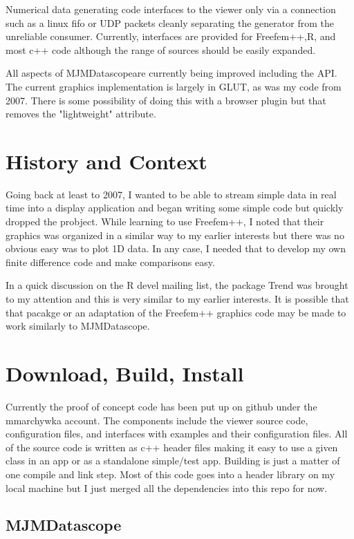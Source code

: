 \documentclass[aps,secnumarabic,balancelastpage,amsmath,amssymb,nofootinbib]{revtex4}
\newcommand{\mjmprod}{MJMDatascope}
\begin{document}
Numerical data generating code interfaces to the viewer
only via a connection such as a linux fifo or 
UDP packets cleanly separating the generator from the 
unreliable consumer. Currently, interfaces are provided
for Freefem++,R, and most c++ code although the range
of sources should be easily expanded. 

All aspects of \mjmprod are currently being improved
including the API. The current graphics implementation
is largely in GLUT, as was my code from 2007. There is some
possibility of doing this with a browser plugin but
that removes the "lightweight" attribute. 

\section{History and Context  }
Going back at least to 2007, I wanted to be able to stream simple
data in real time into a display application and began writing
some simple code but quickly dropped the probject. While
learning to use Freefem++, I noted that their graphics 
was organized in a similar way to my earlier interests but
there was no obvious easy was to plot 1D data. In any case,
I needed that to develop my own finite difference code
and make comparisons easy.

In a quick discussion on the R devel mailing list, the
package Trend was brought to my attention and this is
very similar to my earlier interests. It is possible that
that pacakge or an adaptation of the Freefem++ graphics
code may be made to work similarly to \mjmprod.

\section{ Download, Build, Install  }

Currently the proof of concept code has been put up
on github under the mmarchywka account.
The components include the viewer source code, configuration
files, and interfaces with examples and their configuration
files. All of the source code is written as c++ header
files making it easy to use a given class in an app
or as a standalone simple/test app. Building is just a matter
of one compile and link step. Most of this code goes into 
a header library on my local machine but I just merged
all the dependencies into this repo for now.  

\subsection{ \mjmprod }
\end{document}
